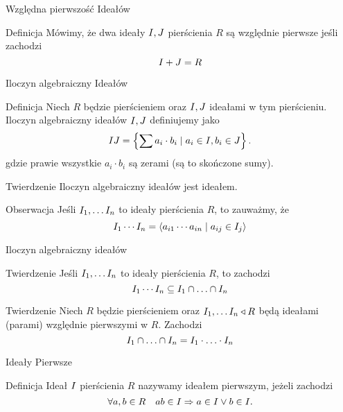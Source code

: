 \documentclass{beamer}
\newcommand{\II}{\mathnormal{I}}
\newcommand{\JJ}{\mathnormal{J}}
\begin{document}
\begin{frame}{Względna pierwszość Ideałów}
    \begin{block}{Definicja}
        Mówimy, że dwa ideały $\II, \JJ$ pierścienia $R$ są \alert{względnie pierwsze} jeśli zachodzi
        $$\II + \JJ = R$$
    \end{block}
\end{frame}

\begin{frame}{Iloczyn algebraiczny Ideałów}
    \begin{block}{Definicja}
        Niech $R$ będzie pierścieniem oraz $\II, \JJ$ ideałami w tym pierścieniu. \alert{Iloczyn algebraiczny ideałów $\II, \JJ$} definiujemy jako
        $$ \II \JJ = \left\{ \sum a_i \cdot b_i \mid a _i\in \II, b_i \in \JJ \right\}.$$
        gdzie prawie wszystkie $a_i \cdot b_i$ są zerami (są to skończone sumy).
    \end{block}
    \pause
    \begin{block}{Twierdzenie}
        Iloczyn algebraiczny ideałów jest ideałem. 
    \end{block}
    \begin{alertblock}{Obserwacja}
        Jeśli $\II_1, \ldots \II_n$ to ideały pierścienia $R$, to zauważmy, że 
        $$ \II_1 \cdots \II_n =  \langle a_{i1} \cdots a_{in} \mid a_{ij} \in I_j \rangle$$
    \end{alertblock}
\end{frame}

\begin{frame}{Iloczyn algebraiczny ideałów}
    \begin{block}{Twierdzenie}
        Jeśli $\II_1, \ldots \II_n$ to ideały pierścienia $R$, to zachodzi
        $$\II_1 \cdots \II_n \subseteq \II_1 \cap \ldots \cap \II_n $$
    \end{block}
    \pause
    \begin{block}{Twierdzenie}
        Niech $R$ będzie pierścieniem oraz $\II_1 , 
        \ldots \II_n \triangleleft R$ będą ideałami (parami) względnie pierwszymi w $R$. Zachodzi
        $$\II_1 \cap \ldots \cap \II_n = \II_1 \cdot \ldots \cdot \II_n$$
    \end{block}
\end{frame}

\begin{frame}{Ideały Pierwsze}
    \begin{block}{Definicja}
        Ideał $\II$ pierścienia $R$ nazywamy \alert{ideałem pierwszym}, jeżeli zachodzi 
        $$\forall a,b \in R \quad ab \in \II \Rightarrow a \in \II \lor b \in \II .$$
    \end{block}
\end{frame}
\end{document}
